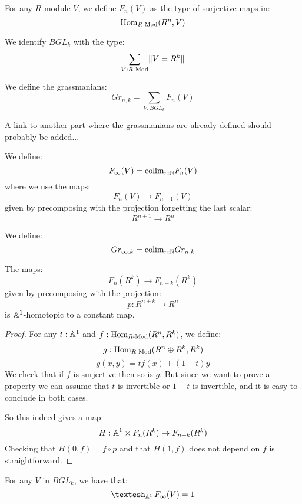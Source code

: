 \begin{definition}
For any $R$-module $V$, we define $F_n(V)$ as the type of surjective maps in:
\[\mathrm{Hom}_{R\text{-}\mathrm{Mod}}(R^n,V)\]
\end{definition}

\begin{remark}
We identify $BGL_k$ with the type:
\[\sum_{V:R\text{-}\mathrm{Mod}} \lVert V=R^k \rVert\]
\end{remark}

\begin{definition}
We define the grassmanians:
\[Gr_{n,k} = \sum_{V:BGL_k}F_n(V)\]
\end{definition}

A link to another part where the grassmanians are already defined should probably be added...

\begin{definition}
We define:
\[F_\infty(V) = \mathrm{colim}_{n:\mathbb{N}} F_n(V)\]
where we use the maps:
\[F_n(V) \to F_{n+1}(V)\]
given by precomposing with the projection forgetting the last scalar:
\[R^{n+1}\to R^{n}\]
\end{definition}

\begin{definition}
We define:
\[Gr_{\infty,k} = \mathrm{colim}_{n:\mathbb{N}} Gr_{n,k}\]
\end{definition}

\begin{lemma}\label{embedding-null-homotopic}
The maps:
\[F_n(R^k) \to F_{n+k}(R^k)\]
given by precomposing with the projection: 
\[p : R^{n+k}\to R^n\] 
is $\mathbb{A}^1$-homotopic to a constant map.
\end{lemma}

\begin{proof}
For any $t:\mathbb{A}^1$ and $f:\mathrm{Hom}_{R\text{-}\mathrm{Mod}}(R^n,R^k)$, we define:
\[g : \mathrm{Hom}_{R\text{-}\mathrm{Mod}}(R^n\oplus R^k,R^k)\]
\[g(x,y) = tf(x) + (1-t)y\]
We check that if $f$ is surjective then so is $g$. But since we want to prove a property we can assume that $t$ is invertible or $1-t$ is invertible, and it is easy to conclude in both cases. 

So this indeed gives a map:
\[H : \mathbb{A}^1\times F_n(R^k) \to F_{n+k}(R^k)\]
Checking that $H(0,f) = f\circ p$ and that $H(1,f)$ does not depend on $f$ is straightforward.
\end{proof}

\begin{lemma}\label{shape-frame-contratible}
For any $V$ in $BGL_k$, we have that: 
\[\shape_{\A^1} F_\infty(V) = 1\]
\end{lemma}

